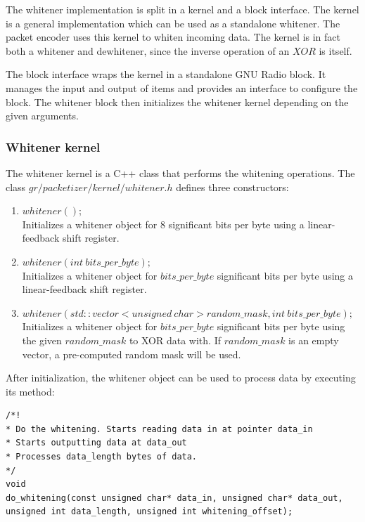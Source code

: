 The whitener implementation is split in a kernel and a block interface. The kernel is a general implementation which can be used as a standalone whitener. The packet encoder uses this kernel to whiten incoming data. The kernel is in fact both a whitener and dewhitener, since the inverse operation of an $XOR$ is itself.\medskip

The block interface wraps the kernel in a standalone GNU Radio block. It manages the input and output of items and provides an interface to configure the block. The whitener block then initializes the whitener kernel depending on the given arguments.

\subsubsection{Whitener kernel}
The whitener kernel is a C++ class that performs the whitening operations. The class $gr/packetizer/kernel/whitener.h$ defines three constructors:
\begin{enumerate}
\item $whitener();$\\
Initializes a whitener object for 8 significant bits per byte using a linear-feedback shift register.

\item $whitener(int\ bits\_per\_byte);$\\
Initializes a whitener object for $bits\_per\_byte$ significant bits per byte using a linear-feedback shift register.

\item $whitener(std::vector<unsigned\ char> random\_mask, int\ bits\_per\_byte);$\\
Initializes a whitener object for $bits\_per\_byte$ significant bits per byte using the given $random\_mask$ to XOR data with. If $random\_mask$ is an empty vector, a pre-computed random mask will be used.
\end{enumerate}

After initialization, the whitener object can be used to process data by executing its method:

\begin{verbatim}
/*!
* Do the whitening. Starts reading data in at pointer data_in
* Starts outputting data at data_out
* Processes data_length bytes of data.
*/
void
do_whitening(const unsigned char* data_in, unsigned char* data_out, unsigned int data_length, unsigned int whitening_offset);
\end{verbatim}

